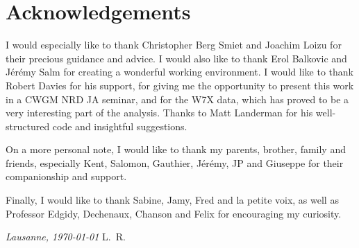 \chapter*{Acknowledgements}

I would especially like to thank Christopher Berg Smiet and Joachim Loizu for their precious guidance and advice. I would also like to thank Erol Balkovic and Jérémy Salm for creating a wonderful working environment. I would like to thank Robert Davies for his support, for giving me the opportunity to present this work in a CWGM NRD JA seminar, and for the W7X data, which has proved to be a very interesting part of the analysis. Thanks to Matt Landerman for his well-structured code and insightful suggestions.

On a more personal note, I would like to thank my parents, brother, family and friends, especially Kent, Salomon, Gauthier, Jérémy, JP and Giuseppe for their companionship and support.

Finally, I would like to thank Sabine, Jamy, Fred and la petite voix, as well as Professor Edgidy, Dechenaux, Chanson and Felix for encouraging my curiosity.

\bigskip
 
\noindent\textit{Lausanne, \today}
\hfill L.~R.
